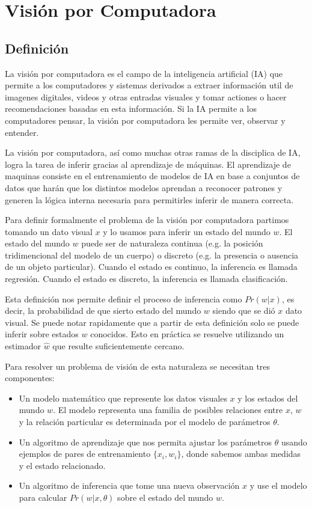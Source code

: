 \documentclass[letter,12pt]{report}
\begin{document}
\section{Visión por Computadora}
\subsection{Definición}
La visión por computadora es el campo de la inteligencia artificial (IA) que permite a
los computadores y sistemas derivados a extraer información util de imagenes digitales,
videos y otras entradas visuales y tomar actiones o hacer recomendaciones basadas en esta
información. Si la IA permite a los computadores pensar, la visión por computadora les
permite ver, observar y entender\cite{IBM}.

La visión por computadora, así como muchas otras ramas de la disciplica de IA, logra la
tarea de inferir gracias al aprendizaje de máquinas. El aprendizaje de maquinas consiste
en el entrenamiento de modelos de IA en base a conjuntos de datos que harán que los
distintos modelos aprendan a reconocer patrones y generen la lógica interna necesaria
para permitirles inferir de manera correcta.

Para definir formalmente el problema de la visión por computadora\cite{Prince} partimos tomando un
dato visual $x$ y lo usamos para inferir un estado del mundo $w$. El estado del mundo $w$
puede ser de naturaleza continua (e.g. la posición tridimencional del modelo de un
cuerpo) o discreto (e.g. la presencia o ausencia de un objeto particular). Cuando el
estado es continuo, la inferencia es llamada regresión. Cuando el estado es discreto, la
inferencia es llamada clasificación.

Esta definición nos permite definir el proceso de inferencia como $Pr(w|x)$, es decir, la
probabilidad de que sierto estado del mundo $w$ siendo que se dió $x$ dato visual. Se
puede notar rapidamente que a partir de esta definición solo se puede inferir sobre
estados $w$ conocidos. Esto en práctica se resuelve utilizando un estimador $\hat{w}$ que
resulte suficientemente cercano.

Para resolver un problema de visión de esta naturaleza se necesitan tres componentes:
\begin{itemize}
    \item Un modelo matemático que represente los datos visuales $x$ y los estados del
        mundo $w$. El modelo representa una familia de posibles relaciones entre $x$, 
        $w$ y la relación particular es determinada por el modelo de parámetros $\theta$.
    \item Un algoritmo de aprendizaje que nos permita ajustar los parámetros $\theta$
        usando ejemplos de pares de entrenamiento $\{x_i, w_i\}$, donde sabemos ambas
        medidas y el estado relacionado.
    \item Un algoritmo de inferencia que tome una nueva observación $x$ y use el modelo
        para calcular $Pr(w|x, \theta)$ sobre el estado del mundo $w$.
\end{itemize}
\end{document}
